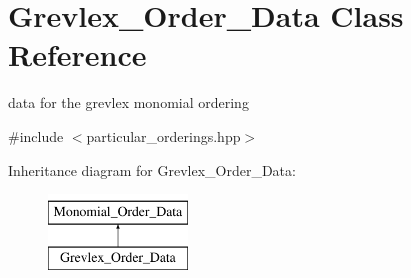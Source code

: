 \hypertarget{class_grevlex___order___data}{}\section{Grevlex\+\_\+\+Order\+\_\+\+Data Class Reference}
\label{class_grevlex___order___data}


data for the grevlex monomial ordering  




{\ttfamily \#include $<$particular\+\_\+orderings.\+hpp$>$}

Inheritance diagram for Grevlex\+\_\+\+Order\+\_\+\+Data\+:\begin{figure}[H]
\begin{center}
\leavevmode
\includegraphics[height=2.000000cm]{class_grevlex___order___data}
\end{center}
\end{figure}
